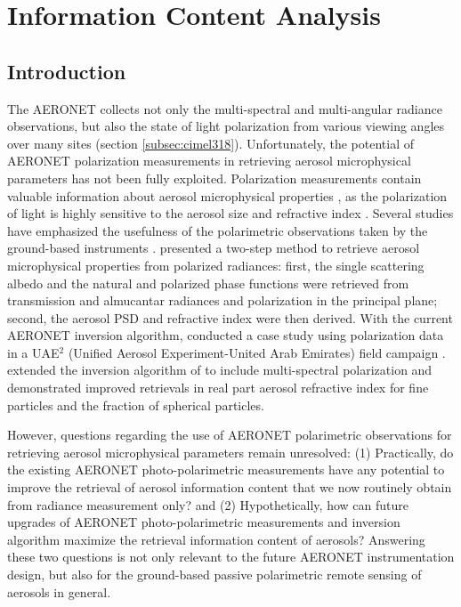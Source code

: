 \chapter{Information Content Analysis}

\section{Introduction}

The AERONET collects not only the multi-spectral and multi-angular radiance
observations, but also the state of light polarization from various viewing
angles over many sites (section \ref{subsec:cimel318}). 
Unfortunately, the potential of AERONET polarization
measurements in retrieving aerosol microphysical parameters has not been fully
exploited. Polarization measurements contain valuable information about aerosol
microphysical properties \citep{Mishchenko97,Cairns97}, as
the polarization of light is highly sensitive to the aerosol size and
refractive index \citep{Hansen74}. Several studies have emphasized the
usefulness of the polarimetric observations taken by the ground-based
instruments \citep{Cairns97, Boesche06, Emde10, Zeng08}.  
\citet{Vermeulen00} presented a two-step method to retrieve
aerosol microphysical properties from polarized radiances: first, the single
scattering albedo and the natural and polarized phase functions were retrieved
from transmission and almucantar radiances and polarization in the principal
plane; second, the aerosol PSD and refractive index were then derived. With the
current AERONET inversion algorithm, \citet{Dubovik06} conducted a case
study using polarization data in a UAE$^2$ (Unified Aerosol Experiment-United 
Arab Emirates) field campaign \citep{Reid08}. \citet{Li09} extended the
inversion algorithm of \citet{Dubovik06} to include multi-spectral
polarization and demonstrated improved retrievals in real part aerosol
refractive index for fine particles and the fraction of spherical particles.

However, questions regarding the use of AERONET polarimetric observations for
retrieving aerosol microphysical parameters remain unresolved: (1) Practically,
do the existing AERONET photo-polarimetric measurements have any potential to
improve the retrieval of aerosol information content that we now routinely
obtain from radiance measurement only? and (2) Hypothetically, how can future
upgrades of AERONET photo-polarimetric measurements and inversion algorithm
maximize the retrieval information content of aerosols? Answering these two
questions is not only relevant to the future AERONET instrumentation design,
but also for the ground-based passive polarimetric remote sensing of aerosols
in general. 

